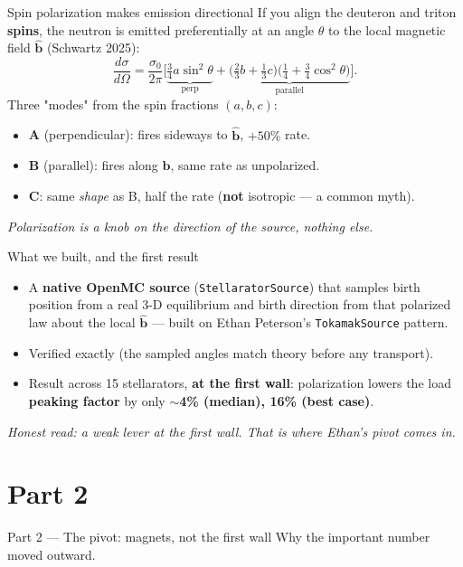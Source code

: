 \documentclass[11pt,aspectratio=169]{beamer}
\newcommand{\key}[1]{\textcolor{key}{\textbf{#1}}}
\newcommand{\bhat}{\hat{\mathbf{b}}}
\newcommand{\qq}[1]{\begin{center}\emph{#1}\end{center}}
\begin{document}
\begin{frame}{Spin polarization makes emission directional}
If you align the deuteron and triton \key{spins}, the neutron is emitted preferentially at
an angle \(\theta\) to the local magnetic field \(\bhat\) (Schwartz 2025):
\[
\frac{d\sigma}{d\Omega} = \frac{\sigma_0}{2\pi}\Big[
\underbrace{\tfrac34 a\sin^2\theta}_{\text{perp}}
+ \underbrace{\big(\tfrac23 b+\tfrac13 c\big)\big(\tfrac14+\tfrac34\cos^2\theta\big)}_{\text{parallel}}\Big].
\]
Three "modes" from the spin fractions \((a,b,c)\):
\begin{itemize}\footnotesize
\item \key{A} (perpendicular): fires sideways to \(\bhat\), \(+50\%\) rate.
\item \key{B} (parallel): fires along \(\bhat\), same rate as unpolarized.
\item \key{C}: same \emph{shape} as B, half the rate (\textbf{not} isotropic --- a common myth).
\end{itemize}
\qq{Polarization is a knob on the \emph{direction} of the source, nothing else.}
\end{frame}

\begin{frame}{What we built, and the first result}
\begin{itemize}
\item A \key{native OpenMC source} (\texttt{StellaratorSource}) that samples birth position
      from a real 3-D equilibrium and birth direction from that polarized law about the
      local \(\bhat\) --- built on Ethan Peterson's \texttt{TokamakSource} pattern.
\item Verified exactly (the sampled angles match theory before any transport).
\item Result across 15 stellarators, \key{at the first wall}: polarization lowers the load
      \key{peaking factor} by only \key{$\sim$4\% (median), 16\% (best case)}.
\end{itemize}
\qq{Honest read: a weak lever at the first wall. That is where Ethan's pivot comes in.}
\end{frame}

\section{Part 2}
\begin{frame}{Part 2 --- The pivot: magnets, not the first wall}\Large
Why the important number moved outward.\end{frame}
\end{document}
